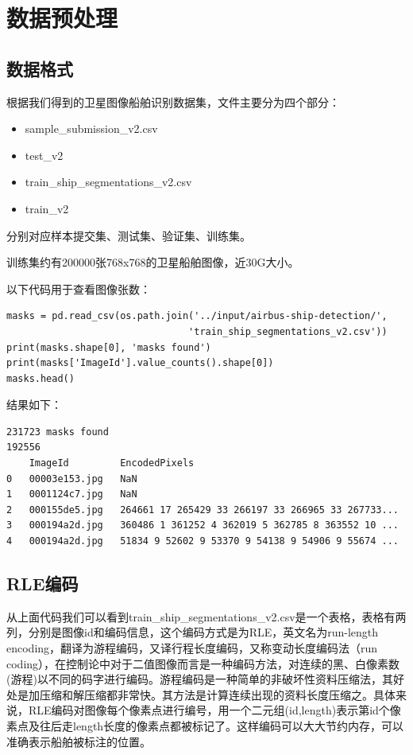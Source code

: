 
\chapter{数据预处理}

\section{数据格式}

根据我们得到的卫星图像船舶识别数据集，文件主要分为四个部分：

\begin{itemize}
\tightlist
\item
  sample\_submission\_v2.csv
\item
  test\_v2
\item
  train\_ship\_segmentations\_v2.csv
\item
  train\_v2
\end{itemize}

分别对应样本提交集、测试集、验证集、训练集。

训练集约有200000张768x768的卫星船舶图像，近30G大小。

以下代码用于查看图像张数：

\begin{verbatim}
masks = pd.read_csv(os.path.join('../input/airbus-ship-detection/',
                                'train_ship_segmentations_v2.csv'))
print(masks.shape[0], 'masks found')
print(masks['ImageId'].value_counts().shape[0])
masks.head()
\end{verbatim}

结果如下：

\begin{verbatim}
231723 masks found
192556
    ImageId         EncodedPixels
0   00003e153.jpg   NaN
1   0001124c7.jpg   NaN
2   000155de5.jpg   264661 17 265429 33 266197 33 266965 33 267733...
3   000194a2d.jpg   360486 1 361252 4 362019 5 362785 8 363552 10 ...
4   000194a2d.jpg   51834 9 52602 9 53370 9 54138 9 54906 9 55674 ...
\end{verbatim}

\section{RLE编码}

从上面代码我们可以看到train\_ship\_segmentations\_v2.csv是一个表格，表格有两列，分别是图像id和编码信息，这个编码方式是为RLE，英文名为run-length
encoding，翻译为游程编码，又译行程长度编码，又称变动长度编码法（run
coding），在控制论中对于二值图像而言是一种编码方法，对连续的黑、白像素数(游程)以不同的码字进行编码。游程编码是一种简单的非破坏性资料压缩法，其好处是加压缩和解压缩都非常快。其方法是计算连续出现的资料长度压缩之。具体来说，RLE编码对图像每个像素点进行编号，用一个二元组(id,length)表示第id个像素点及往后走length长度的像素点都被标记了。这样编码可以大大节约内存，可以准确表示船舶被标注的位置。

